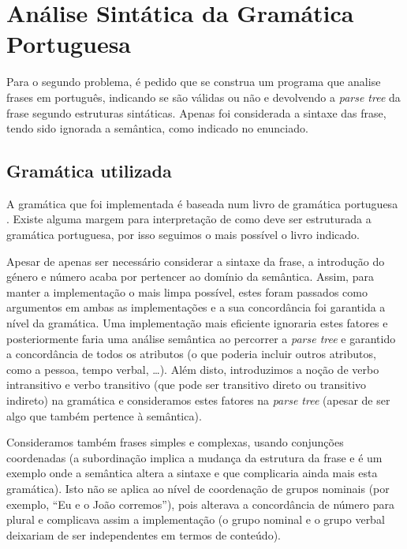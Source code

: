 \documentclass[12pt,a4paper,oneside]{article}
\begin{document}

\section{Análise Sintática da Gramática Portuguesa}
\label{sec:sin}

Para o segundo problema, é pedido que se construa um programa que
analise frases em português, indicando se são válidas ou não e
devolvendo a \textit{parse tree} da frase segundo estruturas
sintáticas. Apenas foi considerada a sintaxe das frase, tendo sido
ignorada a semântica, como indicado no enunciado.
 
\subsection{Gramática utilizada}

A gramática que foi implementada é baseada num livro de gramática
portuguesa \cite{arezedo:2013}. Existe alguma margem para interpretação
de como deve ser estruturada a gramática portuguesa, por isso seguimos
o mais possível o livro indicado.

Apesar de apenas ser necessário considerar a sintaxe da frase, a
introdução do género e número acaba por pertencer ao domínio da
semântica. Assim, para manter a implementação o mais limpa possível,
estes foram passados como argumentos em ambas as implementações e a
sua concordância foi garantida a nível da gramática. Uma implementação
mais eficiente ignoraria estes fatores e posteriormente faria uma
análise semântica ao percorrer a \textit{parse tree} e garantido a
concordância de todos os atributos (o que poderia incluir outros
atributos, como a pessoa, tempo verbal, \ldots). Além disto,
introduzimos a noção de verbo intransitivo e verbo transitivo (que
pode ser transitivo direto ou transitivo indireto) na gramática e
consideramos estes fatores na \textit{parse tree} (apesar de ser algo
que também pertence à semântica).

Consideramos também frases simples e complexas, usando conjunções
coordenadas (a subordinação implica a mudança da estrutura da frase e
é um exemplo onde a semântica altera a sintaxe e que complicaria ainda
mais esta gramática). Isto não se aplica ao nível de coordenação de
grupos nominais (por exemplo, ``Eu e o João corremos''), pois alterava
a concordância de número para plural e complicava assim a
implementação (o grupo nominal e o grupo verbal deixariam de ser
independentes em termos de conteúdo).
\end{document}
